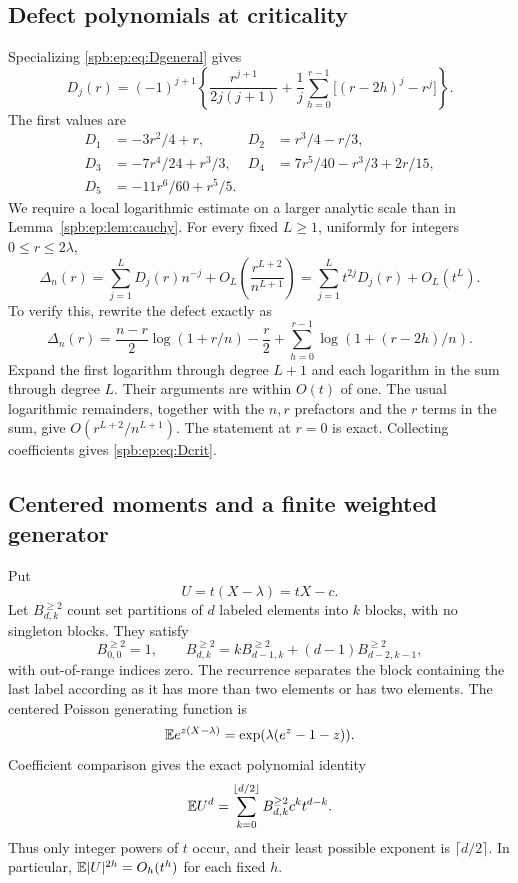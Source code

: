 \subsection{Defect polynomials at criticality}
Specializing \eqref{spb:ep:eq:Dgeneral} gives
\begin{equation}\label{spb:ep:eq:Dcrit}
 D_j(r)=(-1)^{j+1}\left\{
  \frac{r^{j+1}}{2j(j+1)}
  +\frac1j\sum_{h=0}^{r-1}\bigl[(r-2h)^j-r^j\bigr]\right\}.
\end{equation}
The first values are
\begin{align*}
 D_1&=-3r^2/4+r,& D_2&=r^3/4-r/3,\\
 D_3&=-7r^4/24+r^3/3,&
 D_4&=7r^5/40-r^3/3+2r/15,\\
 D_5&=-11r^6/60+r^5/5.
\end{align*}
We require a local logarithmic estimate on a larger analytic scale than
in Lemma~\ref{spb:ep:lem:cauchy}.
For every fixed $L\ge1$, uniformly for integers $0\le r\le2\lambda$,
\begin{equation}\label{spb:ep:eq:criticalDrem}
 \Delta_n(r)=\sum_{j=1}^L D_j(r)n^{-j}
          +O_L\left(\frac{r^{L+2}}{n^{L+1}}\right)
       =\sum_{j=1}^L t^{2j}D_j(r)+O_L(t^L).
\end{equation}
To verify this, rewrite the defect exactly as
\[
 \Delta_n(r)=\frac{n-r}{2}\log(1+r/n)-\frac r2
            +\sum_{h=0}^{r-1}\log(1+(r-2h)/n).
\]
Expand the first logarithm through degree $L+1$ and each logarithm in
the sum through degree $L$. Their arguments are within $O(t)$ of one.
The usual logarithmic remainders, together with the $n,r$ prefactors
and the $r$ terms in the sum, give $O(r^{L+2}/n^{L+1})$.
The statement at $r=0$ is exact. Collecting coefficients gives
\eqref{spb:ep:eq:Dcrit}.

\subsection{Centered moments and a finite weighted generator}
Put
\begin{equation}\label{spb:ep:eq:Ucenter}
 U=t(X-\lambda)=tX-c.
\end{equation}
Let $B_{d,k}^{\ge2}$ count set partitions of $d$ labeled elements into
$k$ blocks, with no singleton blocks. They satisfy
\begin{equation}\label{spb:ep:eq:assocStirling}
 B_{0,0}^{\ge2}=1,\qquad
 B_{d,k}^{\ge2}=kB_{d-1,k}^{\ge2}+(d-1)B_{d-2,k-1}^{\ge2},
\end{equation}
with out-of-range indices zero. The recurrence separates the block
containing the last label according as it has more than two elements or
has two elements.
The centered Poisson generating function is
\[
 \mathbb E e^{z(X-\lambda)}=\exp(\lambda(e^z-1-z)).
\]
Coefficient comparison gives the exact polynomial identity
\begin{equation}\label{spb:ep:eq:centralmoment}
 \mathbb E U^d=\sum_{k=0}^{\lfloor d/2\rfloor}
           B_{d,k}^{\ge2}c^k t^{d-k}.
\end{equation}
Thus only integer powers of $t$ occur, and their least possible exponent
is $\lceil d/2\rceil$. In particular,
$\mathbb E|U|^{2h}=O_h(t^h)$ for each fixed $h$.

